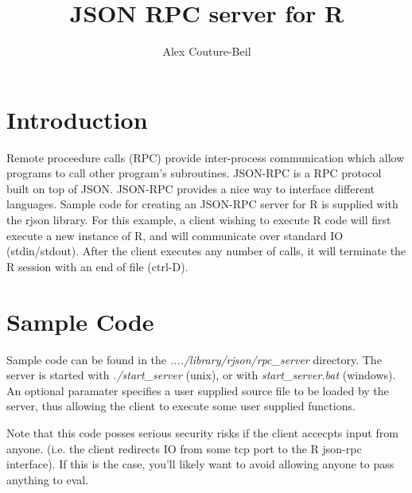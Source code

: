 \documentclass[letter]{article}
\begin{document}
\title{JSON RPC server for R}
\author{Alex Couture-Beil}
\maketitle

\section{Introduction}

Remote proceedure calls (RPC) provide inter-process communication which allow programs to call other program's subroutines. JSON-RPC is a RPC protocol built on top of JSON.
JSON-RPC provides a nice way to interface different languages. Sample code for creating an JSON-RPC server for R is supplied with the rjson library. For this example, 
a client wishing to execute R code will first execute a new instance of R, and will communicate over standard IO (stdin/stdout). After the client executes any number of calls, it will terminate the R session with an end of file (ctrl-D).

\section{Sample Code}

Sample code can be found in the {\it ..../library/rjson/rpc\_server} directory. The server is started with {\it ./start\_server} (unix), or with {\it start\_server.bat} (windows). 
An optional paramater specifies a user supplied source file to be loaded by the server, thus allowing the client to execute some user supplied functions.

Note that this code posses serious security risks if the client accecpts input from anyone. (i.e. the client redirects IO from some tcp port to the R json-rpc interface). If this is the case, you'll likely want to avoid allowing anyone to pass anything to eval.
\end{document}
